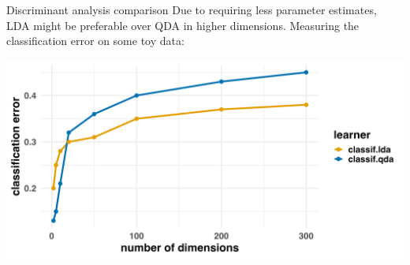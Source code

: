 \documentclass[11pt,compress,t,notes=noshow, xcolor=table]{beamer}
\begin{document}
\begin{vbframe}{Discriminant analysis comparison}
Due to requiring less parameter estimates, LDA might be preferable over QDA in higher dimensions. Measuring the classification error on some toy data:

\begin{center}
\includegraphics[width=\textwidth, clip=true, trim={0 0 0 0}]{figure/disc_cod.png}
\end{center}

\end{vbframe}
\endlecture
\end{document}
